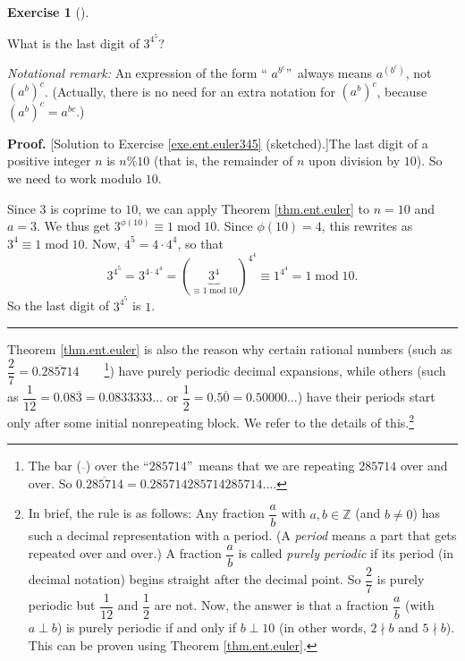 \documentclass[numbers=enddot,12pt,final,onecolumn,notitlepage]{scrartcl}%
\newcounter{exer}
\numberwithin{exer}{subsection}
\theoremstyle{definition}
\newtheorem{exmp}[exer]{Exercise}
\newenvironment{exercise}[1][]
{\begin{exmp}[#1]\begin{leftbar}}
{\end{leftbar}\end{exmp}}
\newenvironment{proof}[1][Proof]{\noindent\textbf{#1.} }{\ \rule{0.5em}{0.5em}}
\begin{document}
\begin{exercise}
\label{exe.ent.euler345}What is the last digit of $3^{4^{5}}$?

\textit{Notational remark:} An expression of the form \textquotedblleft%
$a^{b^{c}}$\textquotedblright\ always means $a^{\left(  b^{c}\right)  }$, not
$\left(  a^{b}\right)  ^{c}$. (Actually, there is no need for an extra
notation for $\left(  a^{b}\right)  ^{c}$, because $\left(  a^{b}\right)
^{c}=a^{bc}$.)
\end{exercise}

\begin{proof}
[Solution to Exercise \ref{exe.ent.euler345} (sketched).]The last digit of a
positive integer $n$ is $n\%10$ (that is, the remainder of $n$ upon division
by $10$). So we need to work modulo $10$.

Since $3$ is coprime to $10$, we can apply Theorem \ref{thm.ent.euler} to
$n=10$ and $a=3$. We thus get $3^{\phi\left(  10\right)  }\equiv
1\operatorname{mod}10$. Since $\phi\left(  10\right)  =4$, this rewrites as
$3^{4}\equiv1\operatorname{mod}10$. Now, $4^{5}=4\cdot4^{4}$, so that%
\[
3^{4^{5}}=3^{4\cdot4^{4}}=\left(  \underbrace{3^{4}}_{\equiv
1\operatorname{mod}10}\right)  ^{4^{4}}\equiv1^{4^{4}}=1\operatorname{mod}10.
\]
So the last digit of $3^{4^{5}}$ is $1$.
\end{proof}

Theorem \ref{thm.ent.euler} is also the reason why certain rational numbers
(such as $\dfrac{2}{7}=0.\overline{285714}$\ \ \ \ \footnote{The bar
($\overline{}$) over the \textquotedblleft$285714$\textquotedblright\ means
that we are repeating $285714$ over and over. So $0.\overline{285714}%
=0.285714285714285714\ldots$.}) have purely periodic decimal expansions, while
others (such as $\dfrac{1}{12}=0.08\overline{3}=0.0833333\ldots$ or $\dfrac
{1}{2}=0.5\overline{0}=0.50000\ldots$) have their periods start only after
some initial nonrepeating block. We refer \cite[\S 4]{Conrad-Euler} to the
details of this.\footnote{In brief, the rule is as follows: Any fraction
$\dfrac{a}{b}$ with $a,b\in\mathbb{Z}$ (and $b\neq0$) has such a decimal
representation with a period. (A \textit{period} means a part that gets
repeated over and over.) A fraction $\dfrac{a}{b}$ is called \textit{purely
periodic} if its period (in decimal notation) begins straight after the
decimal point. So $\dfrac{2}{7}$ is purely periodic but $\dfrac{1}{12}$ and
$\dfrac{1}{2}$ are not. Now, the answer is that a fraction $\dfrac{a}{b}$
(with $a\perp b$) is purely periodic if and only if $b\perp10$ (in other
words, $2\nmid b$ and $5\nmid b$). This can be proven using Theorem
\ref{thm.ent.euler}.}
\end{document}
